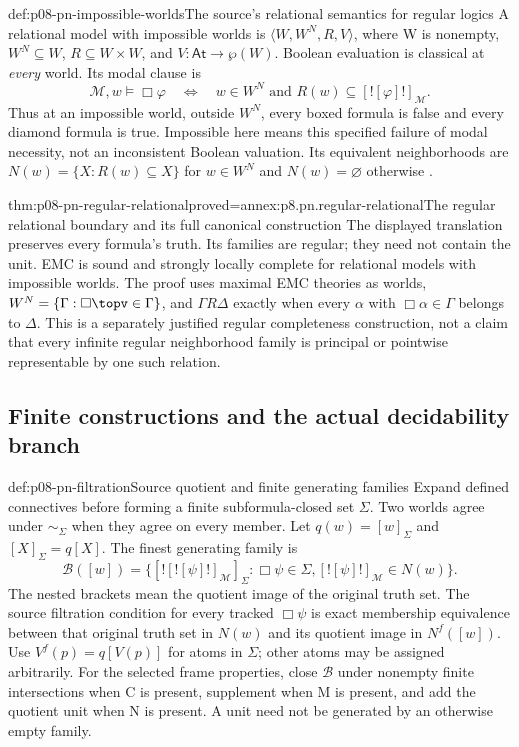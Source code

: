 \begin{hbdefinition}{def:p08-pn-impossible-worlds}{The source's relational semantics for regular logics}
A relational model with impossible worlds is
\(\langle W,W^N,R,V\rangle\), where W is nonempty,
\(W^N\subseteq W\), \(R\subseteq W\times W\), and
\(V:\mathsf{At}\to\wp(W)\). Boolean evaluation is classical
at \emph{every} world. Its modal clause is
\[
 \mathcal M,w\models\Box\varphi
 \quad\Longleftrightarrow\quad
 w\in W^N\text{ and }R(w)\subseteq[![\varphi]!]_{\mathcal M}.
\]
Thus at an impossible world, outside \(W^N\), every boxed
formula is false and every diamond formula is true. Impossible
here means this specified failure of modal necessity, not an
inconsistent Boolean valuation. Its equivalent neighborhoods
are \(N(w)=\{X:R(w)\subseteq X\}\) for \(w\in W^N\)
and \(N(w)=\varnothing\) otherwise
\cite[\S2.2.4, def.~2.22, ex.~2.13]{Pacuit2017}.
\end{hbdefinition}

\begin{hbtheorem}{thm:p08-pn-regular-relational}{proved=annex:p8.pn.regular-relational}{The regular relational boundary and its full canonical construction}
The displayed translation preserves every formula's truth.
Its families are regular; they need not contain the unit.
EMC is sound and strongly locally complete for relational
models with impossible worlds. The proof uses maximal EMC
theories as worlds, \(W^N=\{\Gamma:\Box\topv\in\Gamma\}\),
and \(\Gamma R\Delta\) exactly when every \(\alpha\) with
\(\Box\alpha\in\Gamma\) belongs to \(\Delta\).
This is a separately justified regular completeness construction,
not a claim that every infinite regular neighborhood family is
principal or pointwise representable by one such relation.
\end{hbtheorem}

\subsection{Finite constructions and the actual decidability branch}

\begin{hbdefinition}{def:p08-pn-filtration}{Source quotient and finite generating families}
Expand defined connectives before forming a finite subformula-closed
set \(\Sigma\). Two worlds agree under \(\sim_\Sigma\) when
they agree on every member. Let \(q(w)=[w]_\Sigma\) and
\([X]_\Sigma=q[X]\). The finest generating family is
\[
 \mathcal B([w])=
 \{[![![\psi]!]_{\mathcal M}]_\Sigma:
                 \Box\psi\in\Sigma, [![\psi]!]_{\mathcal M}\in N(w)\}.
\]
The nested brackets mean the quotient image of the original truth set.
The source filtration condition for every tracked \(\Box\psi\)
is exact membership equivalence between that original truth set
in \(N(w)\) and its quotient image in \(N^f([w])\).
Use \(V^f(p)=q[V(p)]\) for atoms in \(\Sigma\); other atoms
may be assigned arbitrarily. For the selected frame properties,
close \(\mathcal B\) under nonempty finite intersections when
C is present, supplement when M is present, and add the quotient
unit when N is present. A unit need not be generated by an
otherwise empty family.
\end{hbdefinition}

